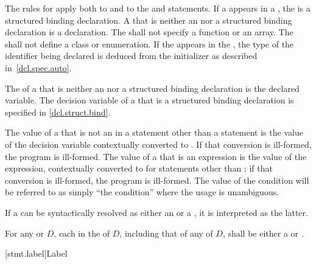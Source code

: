 \pnum
{}%
The rules for  apply both
to  and
to the  and  statements.
If a 
appears in a ,
the  is a structured binding declaration.
A  that is
neither an  nor a structured binding declaration
is a declaration.
The  shall not
specify a function or an array. The  shall not
define a class or enumeration. If the   appears in
the ,
the type of the identifier being declared is deduced from the initializer as described in~\ref{dcl.spec.auto}.

\pnum
The  of a 
that is neither an  nor a structured binding declaration
is the declared variable.
The decision variable of a 
that is a structured binding declaration is specified in \ref{dcl.struct.bind}.

\pnum
The value of a  that is not an 
in a statement other than a  statement is the value of the
decision variable
contextually converted to .
If that
conversion is ill-formed, the program is ill-formed.
The value of a
 that is an expression is the value of the
expression, contextually converted to 
for statements other
than ;
if that conversion is ill-formed, the program is
ill-formed. The value of the condition will be referred to as simply
``the condition'' where the usage is unambiguous.

\pnum
If a  can be syntactically resolved
as either an  or a ,
it is interpreted as the latter.

\pnum
For any  or  $D$,
each 
in the  of $D$,
including that of any  of $D$,
shall be either a 
or .

[stmt.label]{Label}%

